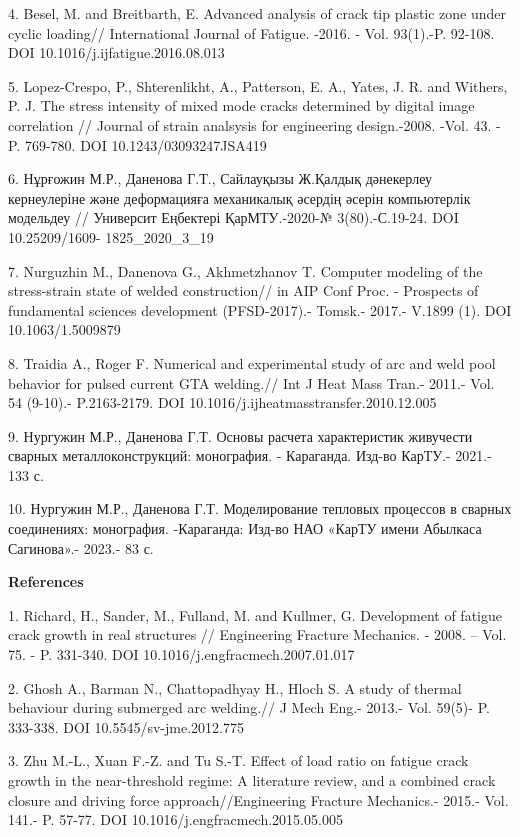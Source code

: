 4. Besel, M. and Breitbarth, E. Advanced analysis of crack tip plastic
zone under cyclic loading// International Journal of Fatigue. -2016. -
Vol. 93(1).-P. 92-108. DOI 10.1016/j.ijfatigue.2016.08.013

5. Lopez-Crespo, P., Shterenlikht, A., Patterson, E. A., Yates, J. R.
and Withers, P. J. The stress intensity of mixed mode cracks determined
by digital image correlation // Journal of strain analsysis for
engineering design.-2008. -Vol. 43. - P. 769-780. DOI
10.1243/03093247JSA419

6. Нұрғожин М.Р., Даненова Г.Т., Сайлауқызы Ж.Қалдық дәнекерлеу
кернеулеріне және деформацияға механикалық әсердің әсерін компьютерлік
модельдеу // Университ Еңбектері ҚарМТУ.-2020-№ 3(80).-С.19-24. DOI
10.25209/1609- 1825\_2020\_3\_19

7. Nurguzhin M., Danenova G., Akhmetzhanov T. Computer modeling of the
stress-strain state of welded construction// in AIP Conf Proc. -
Prospects of fundamental sciences development (PFSD-2017).- Tomsk.-
2017.- V.1899 (1). DOI 10.1063/1.5009879

8. Traidia A., Roger F. Numerical and experimental study of arc and weld
pool behavior for pulsed current GTA welding.// Int J Heat Mass Tran.-
2011.- Vol. 54 (9-10).- P.2163-2179. DOI
10.1016/j.ijheatmasstransfer.2010.12.005

9. Нургужин М.Р., Даненова Г.Т. Основы расчета характеристик живучести
сварных металлоконструкций: монография. - Караганда. Изд-во КарТУ.-
2021.- 133 с.

10. Нургужин М.Р., Даненова Г.Т. Моделирование тепловых процессов в
сварных соединениях: монография. -Караганда: Изд-во НАО «КарТУ имени
Абылкаса Сагинова».- 2023.- 83 с.

{\bfseries References}

1. Richard, H., Sander, M., Fulland, M. and Kullmer, G. Development of
fatigue crack growth in real structures // Engineering Fracture
Mechanics. - 2008. -- Vol. 75. - P. 331-340. DOI
10.1016/j.engfracmech.2007.01.017

2. Ghosh A., Barman N., Chattopadhyay H., Hloch S. A study of thermal
behaviour during submerged arc welding.// J Mech Eng.- 2013.- Vol.
59(5)- P. 333-338. DOI 10.5545/sv-jme.2012.775

3. Zhu M.-L., Xuan F.-Z. and Tu S.-T. Effect of load ratio on fatigue
crack growth in the near-threshold regime: A literature review, and a
combined crack closure and driving force approach//Engineering Fracture
Mechanics.- 2015.- Vol. 141.- P. 57-77. DOI
10.1016/j.engfracmech.2015.05.005

